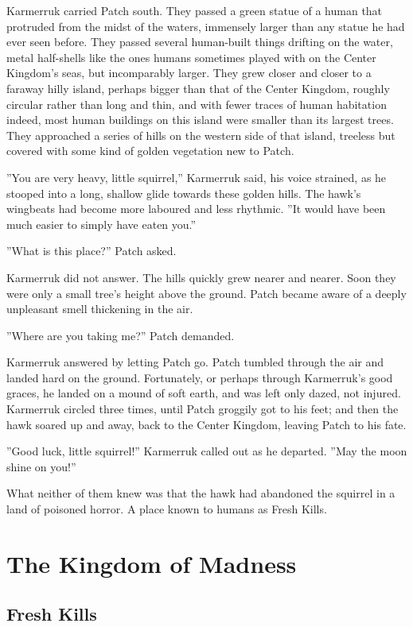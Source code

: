 \documentclass[12pt]{book}
\begin{document}
Karmerruk carried Patch south. They passed a green statue of a human that protruded from the midst of the waters, immensely larger than any statue he had ever seen before. They passed several human-built things drifting on the water, metal half-shells like the ones humans sometimes played with on the Center Kingdom's seas, but incomparably larger. They grew closer and closer to a faraway hilly island, perhaps bigger than that of the Center Kingdom, roughly circular rather than long and thin, and with fewer traces of human habitation %
indeed, most human buildings on this island were smaller than its largest trees. They approached a series of hills on the western side of that island, treeless but covered with some kind of golden vegetation new to Patch.

''You are very heavy, little squirrel,'' Karmerruk said, his voice strained, as he stooped into a long, shallow glide towards these golden hills. The hawk's wingbeats had become more laboured and less rhythmic. ''It would have been much easier to simply have eaten you.''

''What is this place?'' Patch asked.

Karmerruk did not answer. The hills quickly grew nearer and nearer. Soon they were only a small tree's height above the ground. Patch became aware of a deeply unpleasant smell thickening in the air.

''Where are you taking me?'' Patch demanded.

Karmerruk answered by letting Patch go. Patch tumbled through the air and landed hard on the ground. Fortunately, or perhaps through Karmerruk's good graces, he landed on a mound of soft earth, and was left only dazed, not injured. Karmerruk circled three times, until Patch groggily got to his feet; and then the hawk soared up and away, back to the Center Kingdom, leaving Patch to his fate.

''Good luck, little squirrel!'' Karmerruk called out as he departed. ''May the moon shine on you!''

What neither of them knew was that the hawk had abandoned the squirrel in a land of poisoned horror. A place known to humans as Fresh Kills.



\chapter{The Kingdom of Madness}

\section{Fresh Kills}
\end{document}

